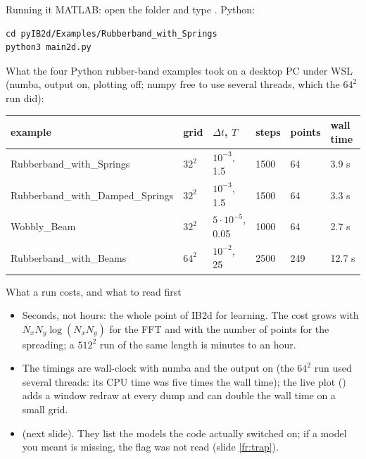 \documentclass[aspectratio=169,11pt]{beamer}
\begin{document}
\begin{frame}[fragile]{Running it}
\label{fr:run}
\small
MATLAB: open the folder and type . Python:
\begin{lstlisting}[style=shell]
cd pyIB2d/Examples/Rubberband_with_Springs
python3 main2d.py
\end{lstlisting}
What the four Python rubber-band examples took on a desktop PC under WSL (numba, output on, plotting off; numpy free to use several threads, which the $64^2$ run did):

\vspace{1mm}
\scriptsize
\begin{tabular}{@{}L{0.32\textwidth}L{0.07\textwidth}L{0.14\textwidth}L{0.08\textwidth}L{0.08\textwidth}L{0.11\textwidth}@{}}
\toprule
example & grid & $\Delta t$, $T$ & steps & points & wall time \\
\midrule
Rubberband\_with\_Springs & $32^2$ & $10^{-3}$, 1.5 & 1500 & 64 & 3.9 s \\
Rubberband\_with\_Damped\_Springs & $32^2$ & $10^{-3}$, 1.5 & 1500 & 64 & 3.3 s \\
Wobbly\_Beam & $32^2$ & $5\cdot10^{-5}$, 0.05 & 1000 & 64 & 2.7 s \\
Rubberband\_with\_Beams & $64^2$ & $10^{-2}$, 25 & 2500 & 249 & 12.7 s \\
\bottomrule
\end{tabular}

\end{frame}

\begin{frame}{What a run costs, and what to read first}
\label{fr:run2}
\small
\begin{itemize}
  \item Seconds, not hours: the whole point of IB2d for learning. The cost grows with $N_x N_y \log(N_x N_y)$ for the FFT and with the number of points for the spreading; a $512^2$ run of the same length is minutes to an hour.
  \item The timings are wall-clock with numba and the output on (the $64^2$ run used several threads: its CPU time was five times the wall time); the live plot () adds a window redraw at every dump and can double the wall time on a small grid.
  \item {} (next slide). They list the models the code actually switched on; if a model you meant is missing, the flag was not read (slide \ref{fr:trap}).
\end{itemize}
\end{frame}
\end{document}

